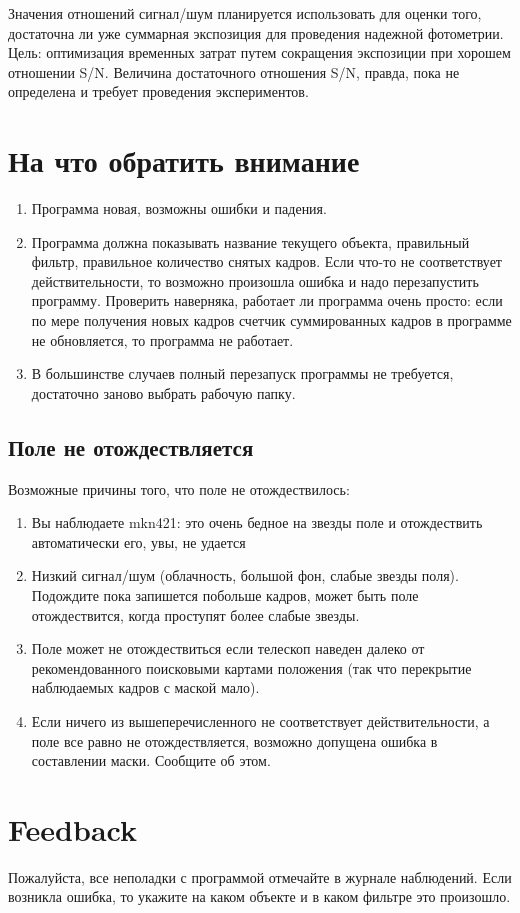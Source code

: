\documentclass[a4paper,12pt,leqno,notitlepage]{article}
\begin{document}
Значения отношений сигнал/шум планируется использовать для оценки того, достаточна ли уже суммарная экспозиция
для проведения надежной фотометрии. Цель: оптимизация временных затрат путем сокращения экспозиции при
хорошем отношении S/N. Величина достаточного отношения S/N, правда, пока не определена и требует
проведения экспериментов.

\section{На что обратить внимание}
\begin{enumerate}
\item Программа новая, возможны ошибки и падения.
\item Программа должна показывать название текущего объекта, правильный фильтр, правильное количество
снятых кадров. Если что-то не соответствует действительности, то возможно произошла ошибка и надо перезапустить
программу. Проверить наверняка, работает ли программа очень просто: если по мере получения новых кадров счетчик
суммированных кадров в программе не обновляется, то программа не работает.
\item В большинстве случаев полный перезапуск программы не требуется, достаточно заново выбрать рабочую папку.
\end{enumerate}

\subsection{Поле не отождествляется}
Возможные причины того, что поле не отождествилось:
\begin{enumerate}
\item Вы наблюдаете mkn421: это очень бедное на звезды поле и отождествить автоматически его, увы, не удается
\item Низкий сигнал/шум (облачность, большой фон, слабые звезды поля). Подождите пока запишется побольше кадров,
 может быть поле отождествится, когда проступят более слабые звезды.
\item Поле может не отождествиться если телескоп наведен далеко от рекомендованного поисковыми картами положения
  (так что перекрытие наблюдаемых кадров с маской мало).
\item Если ничего из вышеперечисленного не соответствует действительности, а поле все равно не отождествляется,
возможно допущена ошибка в составлении маски. Сообщите об этом.
\end{enumerate}

\section{Feedback}
Пожалуйста, все неполадки с программой отмечайте в журнале наблюдений. Если возникла ошибка, то
укажите на каком объекте и в каком фильтре это произошло.
\end{document}
